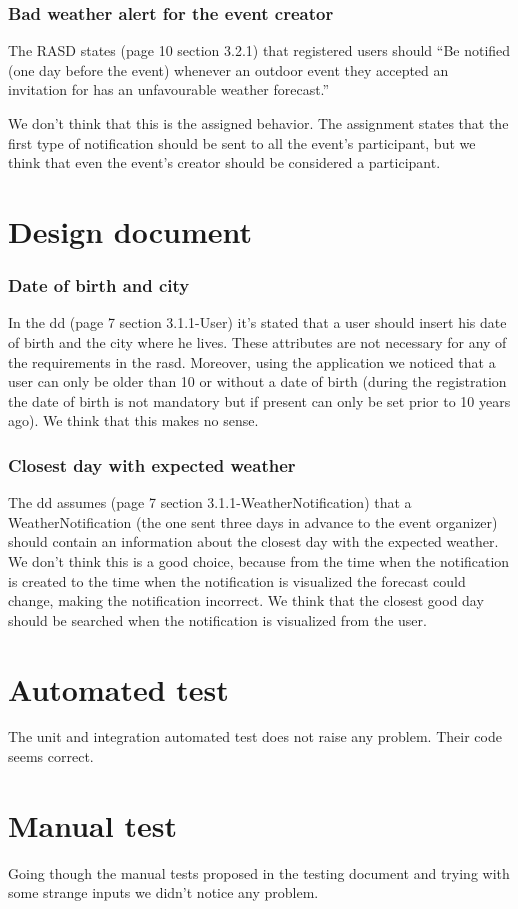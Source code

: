 \documentclass[10pt,a4paper,titlepage]{article}
\begin{document}
\section{Bad weather alert for the event creator}
The RASD states (page 10 section 3.2.1) that registered users should ``Be notified (one day before the event) whenever an outdoor event they accepted an invitation for has an unfavourable weather forecast.''

We don't think that this is the assigned behavior. The assignment states that the first type of notification should be sent to all the event's participant, but we think that even the event's creator should be considered a participant.

\pagebreak
\part{Design document}
\section{Date of birth and city}
In the dd (page 7 section 3.1.1-User) it's stated that a user should insert his date of birth and the city where he lives. These attributes are not necessary for any of the requirements in the rasd. Moreover, using the application we noticed that a user can only be older than 10 or without a date of birth (during the registration the date of birth is not mandatory but if present can only be set prior to 10 years ago). We think that this makes no sense.

\section{Closest day with expected weather}
The dd assumes (page 7 section 3.1.1-WeatherNotification) that a WeatherNotification (the one sent three days in advance to the event organizer) should contain an information about the closest day with the expected weather.
We don't think this is a good choice, because from the time when the notification is created to the time when the notification is visualized the forecast could change, making the notification incorrect. We think that the closest good day should be searched when the notification is visualized from the user.

\pagebreak
\part{Automated test}
The unit and integration automated test does not raise any problem. Their code seems correct.

\part{Manual test}
Going though the manual tests proposed in the testing document and trying with some strange inputs we didn't notice any problem.
\end{document}
